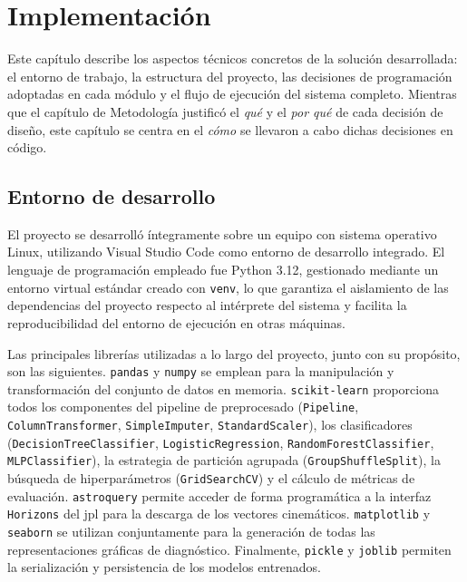 \documentclass[12pt]{report} %
\begin{document}
   
\chapter{Implementación}
 
Este capítulo describe los aspectos técnicos concretos de la solución desarrollada: el entorno de trabajo, la estructura del proyecto, las decisiones de programación adoptadas en cada módulo y el flujo de ejecución del sistema completo. Mientras que el capítulo de Metodología justificó el \textit{qué} y el \textit{por qué} de cada decisión de diseño, este capítulo se centra en el \textit{cómo} se llevaron a cabo dichas decisiones en código.
 
\section{Entorno de desarrollo}
 
El proyecto se desarrolló íntegramente sobre un equipo con sistema operativo Linux, utilizando Visual Studio Code como entorno de desarrollo integrado. El lenguaje de programación empleado fue Python 3.12, gestionado mediante un entorno virtual estándar creado con \texttt{venv}, lo que garantiza el aislamiento de las dependencias del proyecto respecto al intérprete del sistema y facilita la reproducibilidad del entorno de ejecución en otras máquinas.
 
Las principales librerías utilizadas a lo largo del proyecto, junto con su propósito, son las siguientes. \texttt{pandas} y \texttt{numpy} se emplean para la manipulación y transformación del conjunto de datos en memoria. \texttt{scikit-learn} proporciona todos los componentes del pipeline de preprocesado (\texttt{Pipeline}, \texttt{ColumnTransformer}, \texttt{SimpleImputer}, \texttt{StandardScaler}), los clasificadores (\texttt{DecisionTreeClassifier}, \texttt{LogisticRegression}, \texttt{RandomForestClassifier}, \texttt{MLPClassifier}), la estrategia de partición agrupada (\texttt{GroupShuffleSplit}), la búsqueda de hiperparámetros (\texttt{GridSearchCV}) y el cálculo de métricas de evaluación. \texttt{astroquery} permite acceder de forma programática a la interfaz \texttt{Horizons} del \gls{jpl} para la descarga de los vectores cinemáticos. \texttt{matplotlib} y \texttt{seaborn} se utilizan conjuntamente para la generación de todas las representaciones gráficas de diagnóstico. Finalmente, \texttt{pickle} y \texttt{joblib} permiten la serialización y persistencia de los modelos entrenados.
 
\end{document}
